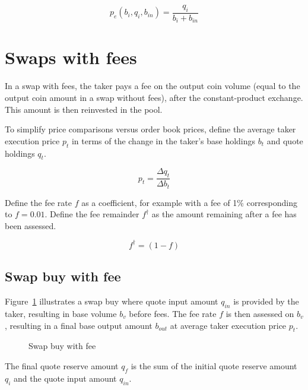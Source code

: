 \documentclass[table, twocolumn]{article}
\begin{document}
\begin{equation}\label{eqn:swap-sell-execution-price-solved}
	p_e (b_i, q_i, b_{in}) = \frac{q_i}{b_i + b_{in}}
\end{equation}

\section{Swaps with fees}\label{sec:swaps-with-fees}

In a swap with fees, the taker pays a fee on the output coin volume (equal to the output
coin amount in a swap without fees), after the constant-product exchange. This amount is
then reinvested in the pool.

To simplify price comparisons versus order book prices, define the average taker
execution price $p_t$ in terms of the change in the taker's base holdings $b_t$ and
quote holdings $q_t$.

\begin{equation}\label{eqn:swap-taker-execution-price}
	p_t = \frac{\Delta q_t}{\Delta b_t}
\end{equation}

Define the fee rate $f$ as a coefficient, for example with a fee of 1\% corresponding to
$f = 0.01$. Define the fee remainder $f^{\dagger}$ as the amount remaining after a fee
has been assessed.

\begin{equation}\label{eqn:fee-remainder}
	f^{\dagger} = (1 - f)
\end{equation}

\subsection{Swap buy with fee}\label{ssec:swap-buy-with-fee}

Figure~\ref{fig:swap-buy-with-fee} illustrates a swap buy where quote input amount
$q_{in}$ is provided by the taker, resulting in base volume $b_v$ before fees. The fee
rate $f$ is then assessed on $b_v$, resulting in a final base output amount $b_{out}$
at average taker execution price $p_t$.

\begin{figure}[!htb]
	\centering
	
	\caption{Swap buy with fee}\label{fig:swap-buy-with-fee}
\end{figure}

The final quote reserve amount $q_f$ is the sum of the initial quote reserve amount
$q_i$ and the quote input amount $q_{in}$.
\end{document}
